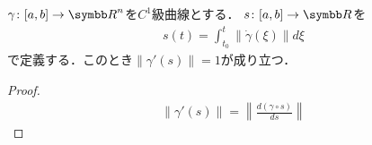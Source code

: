\documentclass{ltjsbook}
\begin{document}
\begin{thmbox}
\begin{proposition}
\(\gamma \colon [a, b] \to {\Real}^n\)を\(C^1\)級曲線とする．
\(s\colon [a, b] \to {\Real}\)を
\begin{align*}
    s(t) = \int_{t_0}^t \left\lVert \dot{\gamma}(\xi) \right\rVert d\xi
\end{align*}
で定義する．このとき\(\lVert \gamma' (s) \rVert = 1\)が成り立つ．
\end{proposition}
\end{thmbox}

\begin{proof}
\begin{align*}
    \lVert \gamma'(s) \rVert = \left\lVert \frac{d(\gamma \circ s)}{ds} \right\rVert
\end{align*}
\end{proof}
\end{document}
